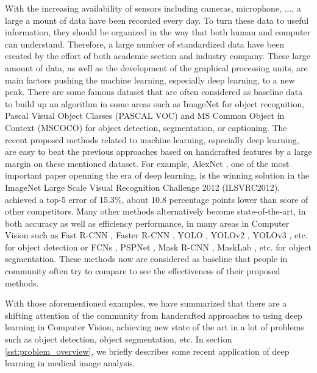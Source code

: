 With the increasing availability of sensors including cameras, microphone, ..., a large a mount of data have been recorded every day. To turn these data to useful information, they should be organized in the way that both human and computer can understand. Therefore, a large number of standardized data have been created by the effort of both academic section and industry company. These large amount of data, as well as the development of the graphical processing units, are main factors pushing the machine learning, especially deep learning, to a new peak. There are some famous dataset that are often considered as baseline data to build up an algorithm in some areas such as ImageNet \cite{ImageNet} for object recognition, Pascal Visual Object Classes (PASCAL VOC) \cite{PASCALVOCDataset} and MS Common Object in Context (MSCOCO) \cite{MSCOCODataset} for object detection, segmentation, or captioning. The recent proposed methods related to machine learning, especially deep learning, are easy to beat the previous approaches based on handcrafted features by a large margin on these mentioned dataset. For example, AlexNet \cite{AlexNet}, one of the most important paper openning the era of deep learning, is the winning solution in the ImageNet Large Scale Visual Recognition Challenge 2012 (ILSVRC2012), achieved a top-5 error of 15.3\%, about 10.8 percentage points lower than score of other competitors. Many other methods alternatively become state-of-the-art, in both accuracy as well as efficiency performance, in many areas in Computer Vision such as Fast R-CNN \cite{FastRCNN}, Faster R-CNN \cite{FasterRCNN}, YOLO \cite{YOLO}, YOLOv2 \cite{YOLOv2}, YOLOv3 \cite{YOLOv3}, etc. for object detection or FCNs \cite{FCNs}, PSPNet \cite{PSPNet}, Mask R-CNN \cite{MaskRCNN}, MaskLab \cite{MaskLab}, etc. for object segmentation. These methods now are considered as baseline that people in community often try to compare to see the effectiveness of their proposed methods. 

With those aforementioned examples, we have summarized that there are a shifting attention of the community from handcrafted approaches to using deep learning in Computer Vision, achieving new state of the art in a lot of problems such as object detection, object segmentation, etc. In section \ref{sst:problem_overview}, we briefly describes some recent application of deep learning in medical image analysis. 


